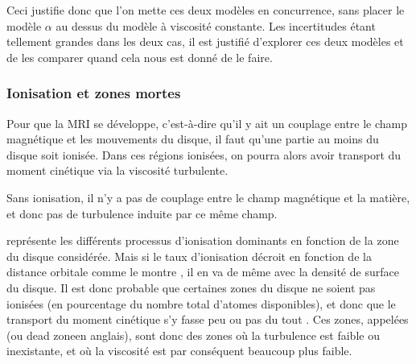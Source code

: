 Ceci justifie donc que l'on mette ces deux modèles en concurrence, sans placer le modèle $\alpha$ au dessus du modèle à viscosité constante. Les incertitudes étant tellement grandes dans les deux cas, il est justifié d'explorer ces deux modèles et de les comparer quand cela nous est donné de le faire.

\subsubsection{Ionisation et zones mortes}\label{sec:ionisation_DZ}
Pour que la MRI se développe, c'est-à-dire qu'il y ait un couplage entre le champ magnétique et les mouvements du disque, il
faut qu'une partie au moins du disque soit ionisée. Dans ces régions ionisées, on pourra alors avoir transport du moment
cinétique via la viscosité turbulente. 

\bigskip

Sans ionisation, il n'y a pas de couplage entre le champ magnétique et la matière, et donc pas de turbulence induite par ce même champ. 

 représente les différents processus d'ionisation dominants en fonction de la zone du disque considérée.
Mais si le taux d'ionisation décroit en fonction de la distance orbitale \citep{ilgner2006ionisation1} comme le montre
, il en va de même avec la densité de surface du disque. Il est donc probable que certaines zones
du disque ne soient pas ionisées (en pourcentage du nombre total d'atomes disponibles), et donc que le transport du moment
cinétique s'y fasse peu ou pas du tout \citep{gammie1996layered}. Ces zones, appelées  (ou \og
dead zone\fg en anglais), sont donc des zones où
la turbulence est faible ou inexistante, et où la viscosité est par conséquent beaucoup plus faible. 

